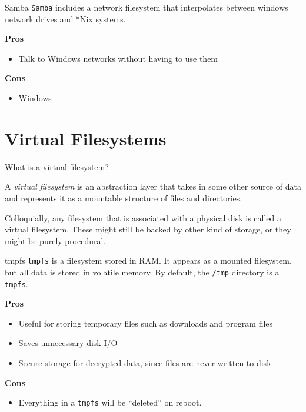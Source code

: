 \documentclass{lug}
\begin{document}
\begin{frame}{Samba}
\texttt{Samba} includes a network filesystem that interpolates between windows
network drives and *Nix systems. 

\textbf{Pros}
\begin{itemize}
    \item Talk to Windows networks without having to use them
\end{itemize}

\textbf{Cons}
\begin{itemize}
    \item Windows
\end{itemize}
\end{frame}

\section{Virtual Filesystems}
\begin{frame}{What is a virtual filesystem?}
\begin{center}
    A \emph{virtual filesystem} is an abstraction layer that takes in some other
    source of data and represents it as a mountable structure of files and
    directories.

    Colloquially, any filesystem that is associated with a physical disk is
    called a virtual filesystem. These might still be backed by other kind of
    storage, or they might be purely procedural.
\end{center}
\end{frame}

\begin{frame}{tmpfs}
    \texttt{tmpfs} is a filesystem stored in RAM. It appears as a mounted
    filesystem, but all data is stored in volatile memory. By default, the
    \texttt{/tmp} directory is a \texttt{tmpfs}.

    \textbf{Pros}
    \begin{itemize}
        \item Useful for storing temporary files such as downloads and program files
        \item Saves unnecessary disk I/O
        \item Secure storage for decrypted data, since files are never written
        to disk
    \end{itemize}

    \textbf{Cons}
    \begin{itemize}
        \item Everything in a \texttt{tmpfs} will be ``deleted'' on reboot.
    \end{itemize}
\end{frame}
\end{document}
